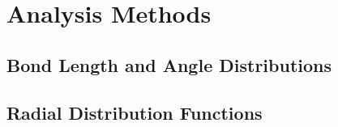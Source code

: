 \section{Analysis Methods}

\subsection{Bond Length and Angle Distributions}

\subsection{Radial Distribution Functions}






